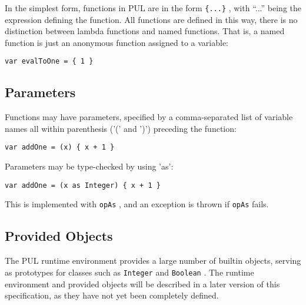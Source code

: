 In the simplest form, functions in PUL are in the form \texttt{\{...\}} , with ``...'' being the expression defining the function. All functions are defined in this way, there is no distinction between lambda functions and named functions. That is, a named function is just an anonymous function assigned to a variable:

\begin{verbatim}
var evalToOne = { 1 }
\end{verbatim}



\subsection{Parameters}

Functions may have parameters, specified by a comma-separated list of variable names all within parenthesis ('(' and ')') preceding the function:

\begin{verbatim}
var addOne = (x) { x + 1 }
\end{verbatim}



Parameters may be type-checked by using 'as':

\begin{verbatim}
var addOne = (x as Integer) { x + 1 }
\end{verbatim}

This is implemented with \texttt{opAs} , and an exception is thrown if \texttt{opAs} fails.



\subsection{Provided Objects}

The PUL runtime environment provides a large number of builtin objects, serving as prototypes for classes such as \texttt{Integer} and \texttt{Boolean} . The runtime environment and provided objects will be described in a later version of this specification, as they have not yet been completely defined.
